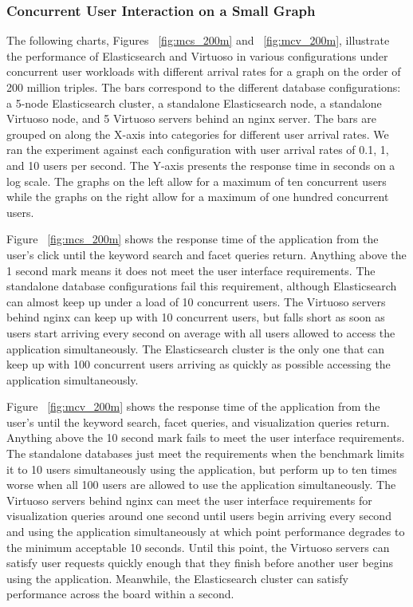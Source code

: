 \subsubsection{Concurrent User Interaction on a Small Graph} 
The following charts, Figures ~\ref{fig:mcs_200m} and ~\ref{fig:mcv_200m}, illustrate the performance of Elasticsearch and Virtuoso in various configurations under concurrent user workloads with different arrival rates for a graph on the order of 200 million triples.
The bars correspond to the different database configurations: a 5-node Elasticsearch cluster, a standalone Elasticsearch node, a standalone Virtuoso node, and 5 Virtuoso servers behind an nginx server.  
The bars are grouped on along the X-axis into categories for different user arrival rates.
We ran the experiment against each configuration with user arrival rates of 0.1, 1, and 10 users per second.
The Y-axis presents the response time in seconds on a log scale.  
The graphs on the left allow for a maximum of ten concurrent users while the graphs on the right allow for a maximum of one hundred concurrent users.  

Figure ~\ref{fig:mcs_200m} shows the response time of the application from the user's click until the keyword search and facet queries return.  Anything above the 1 second mark means it does not meet the user interface requirements.  
The standalone database configurations fail this requirement, although Elasticsearch can almost keep up under a load of 10 concurrent users.
The Virtuoso servers behind nginx can keep up with 10 concurrent users, but falls short as soon as users start arriving every second on average with all users allowed to access the application simultaneously.
The Elasticsearch cluster is the only one that can keep up with 100 concurrent users arriving as quickly as possible accessing the application simultaneously.

Figure ~\ref{fig:mcv_200m} shows the response time of the application from the user's until the keyword search, facet queries, and visualization queries return.  Anything above the 10 second mark fails to meet the user interface requirements.
The standalone databases just meet the requirements when the benchmark limits it to 10 users simultaneously using the application, but perform up to ten times worse when all 100 users are allowed to use the application simultaneously.
The Virtuoso servers behind nginx can meet the user interface requirements for visualization queries around one second until users begin arriving every second and using the application simultaneously at which point performance degrades to the minimum acceptable 10 seconds.
Until this point, the Virtuoso servers can satisfy user requests quickly enough that they finish before another user begins using the application. 
Meanwhile, the Elasticsearch cluster can satisfy performance across the board within a second.  

